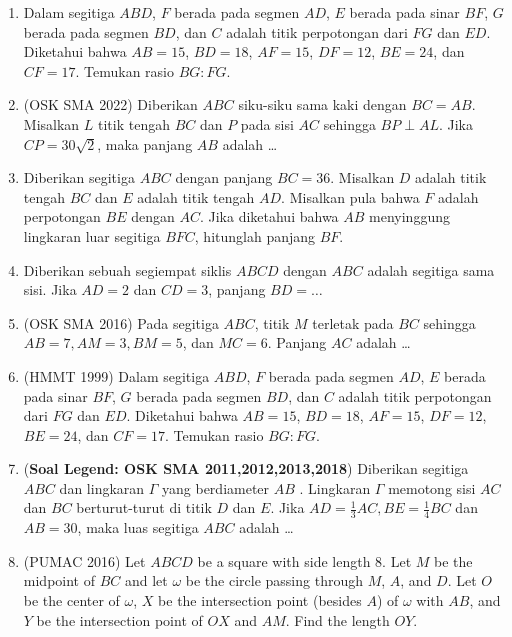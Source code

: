 \documentclass[11pt]{scrartcl}
\begin{document}
\begin{enumerate}
        \item Dalam segitiga $ABD$, $F$ berada pada segmen $AD$, $E$ berada pada sinar $BF$, $G$ berada pada segmen $BD$, dan $C$ adalah titik perpotongan dari $FG$ dan $ED$. Diketahui bahwa $AB = 15$, $BD = 18$, $AF = 15$, $DF = 12$, $BE = 24$, dan $CF = 17$. Temukan rasio $BG : FG$.

    \item (OSK SMA 2022) Diberikan $ABC$ siku-siku sama kaki dengan $BC=AB$. Misalkan $L$ titik tengah $BC$ dan $P$ pada sisi $AC$ sehingga $BP \perp AL$. Jika $CP=30\sqrt{2}$, maka panjang $AB$ adalah \ldots

    \item Diberikan segitiga $ABC$ dengan panjang $BC = 36$. Misalkan $D$ adalah titik tengah $BC$ dan $E$ adalah titik tengah $AD$. Misalkan pula bahwa $F$ adalah perpotongan $BE$ dengan $AC$. Jika diketahui bahwa $AB$ menyinggung lingkaran luar segitiga $BFC$, hitunglah panjang $BF$.

    \item Diberikan sebuah segiempat siklis $ABCD$ dengan $ABC$ adalah segitiga sama sisi. Jika $AD=2$ dan $CD=3$, panjang $BD=\dots$

    \item (OSK SMA 2016) Pada segitiga $ABC$, titik $M$ terletak pada $BC$ sehingga $AB=7, AM=3, BM=5$, dan $MC=6$. Panjang $AC$ adalah \dots

    \item (HMMT 1999) Dalam segitiga $ABD$, $F$ berada pada segmen $AD$, $E$ berada pada sinar $BF$, $G$ berada pada segmen $BD$, dan $C$ adalah titik perpotongan dari $FG$ dan $ED$. Diketahui bahwa $AB = 15$, $BD = 18$, $AF = 15$, $DF = 12$, $BE = 24$, dan $CF = 17$. Temukan rasio $BG : FG$.

    \item (\textbf{Soal Legend: OSK SMA 2011,2012,2013,2018}) Diberikan segitiga $ABC$ dan lingkaran $\Gamma$ yang berdiameter $AB$ . Lingkaran $\Gamma$ memotong sisi $AC$ dan $BC$ berturut-turut di titik $D$ dan $E$. Jika $AD = \frac13 AC, BE =\frac14 BC$ dan $AB = 30$, maka luas segitiga $ABC$ adalah \dots
    
    \item (PUMAC 2016) Let $ABCD$ be a square with side length 8. Let $M$ be the midpoint of $BC$ and let $\omega$ be the circle passing through $M$, $A$, and $D$. Let $O$ be the center of $\omega$, $X$ be the intersection point (besides $A$) of $\omega$ with $AB$, and $Y$ be the intersection point of $OX$ and $AM$. Find the length $OY$.


\end{enumerate}
\end{document}
